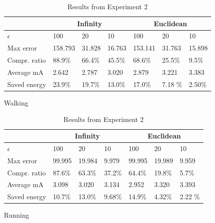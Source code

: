 \documentclass[10pt, conference, compsocconf]{IEEEtran}
\begin{document}
\begin{table}[]
    \begin{subfigure}{\columnwidth}
    \centering
    \begin{tabular}{l|l|l|l|l|l|l}
    \hline
    \rowcolor{headcolor}
                           & \multicolumn{3}{c|}{Infinity} & \multicolumn{3}{c}{Euclidean} \\\hline
    $\epsilon$              & 100       & 20      & 10      & 100       & 20      & 10   \\
    Max error              & 158.793   & 31.828  & 16.763  & 153.141   & 31.763  & 15.898  \\
    Compr.      ratio      & 88.9\%    & 66.4\%  & 45.5\%  & 68.6\%    & 25.5\%  & 9.5\%   \\
    Average mA    & 2.642     & 2.787   & 3.020   & 2.879     & 3.221   & 3.383   \\
    Saved energy  & 23.9\%    & 19.7\%  & 13.0\%  & 17.0\%    & 7.18 \% & 2.50\%\\
    \hline
    \end{tabular}
    \caption{Walking}
    \end{subfigure}
    \begin{subfigure}{\columnwidth}
    \centering
    \begin{tabular}{l|l|l|l|l|l|l}
    \hline
    \rowcolor{headcolor}
                      & \multicolumn{3}{c|}{Infinity} & \multicolumn{3}{c}{Euclidean} \\\hline
    $\epsilon$         & 100      & 20       & 10      & 100      & 20       & 10      \\
    Max error         & 99.995   & 19.984   & 9.979   & 99.995   & 19.989   & 9.959   \\
    Compr.      ratio & 87.6\%   & 63.3\%   & 37.2\%  & 64.4\%   & 19.8\%   & 5.7\%   \\
    Average mA      & 3.098    & 3.020    & 3.134   & 2.952    & 3.320    & 3.393   \\
    Saved energy   &  10.7\%   & 13.0\%   & 9.68\%  & 14.9\%   & 4.32\%   & 2.22 \%\\
    \hline
    \end{tabular}
    \caption{Running}
    \end{subfigure}
    \caption{Results from Experiment 2}
    \label{table:results-energy}
\end{table}

\end{document}
